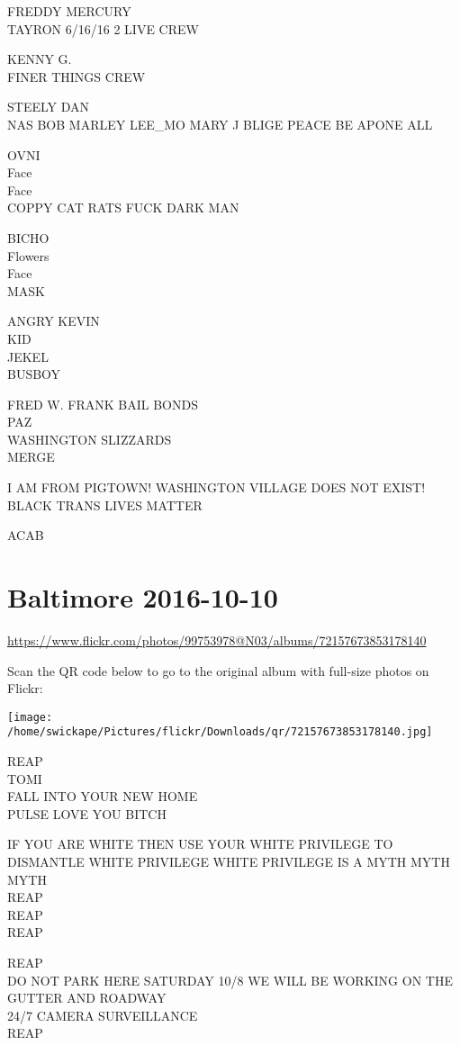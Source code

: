 \documentclass[10pt,letterpaper]{article}
\begin{document}
FREDDY MERCURY\\
TAYRON 6/16/16 2 LIVE CREW

KENNY G.\\
FINER THINGS CREW

STEELY DAN\\
NAS BOB MARLEY LEE\_MO MARY J BLIGE PEACE BE APONE ALL

OVNI\\
Face\\
Face\\
COPPY CAT RATS FUCK DARK MAN

BICHO\\
Flowers\\
Face\\
MASK

ANGRY KEVIN\\
KID\\
JEKEL\\
BUSBOY

FRED W. FRANK BAIL BONDS\\
PAZ\\
WASHINGTON SLIZZARDS\\
MERGE

I AM FROM PIGTOWN!  WASHINGTON VILLAGE DOES NOT EXIST!\\
BLACK TRANS LIVES MATTER

ACAB


\section*{Baltimore 2016-10-10}

\url{https://www.flickr.com/photos/99753978@N03/albums/72157673853178140}

Scan the QR code below to go to the original album with full-size photos on Flickr:

\texttt{[image: /home/swickape/Pictures/flickr/Downloads/qr/72157673853178140.jpg]}


REAP\\
TOMI\\
FALL INTO YOUR NEW HOME\\
PULSE LOVE YOU BITCH

IF YOU ARE WHITE THEN USE YOUR WHITE PRIVILEGE TO DISMANTLE WHITE PRIVILEGE WHITE PRIVILEGE IS A MYTH MYTH MYTH\\
REAP\\
REAP\\
REAP

REAP\\
DO NOT PARK HERE SATURDAY 10/8 WE WILL BE WORKING ON THE GUTTER AND ROADWAY\\
24/7 CAMERA SURVEILLANCE\\
REAP
\end{document}

